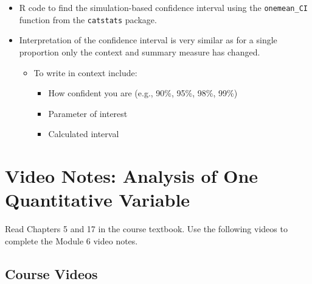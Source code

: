 \documentclass[
]{report}
\newenvironment{Shaded}{\begin{snugshade}}{\end{snugshade}}
\newcommand{\AttributeTok}[1]{\textcolor[rgb]{0.13,0.29,0.53}{#1}}
\newcommand{\CommentTok}[1]{\textcolor[rgb]{0.56,0.35,0.01}{\textit{#1}}}
\newcommand{\DecValTok}[1]{\textcolor[rgb]{0.00,0.00,0.81}{#1}}
\newcommand{\FunctionTok}[1]{\textcolor[rgb]{0.13,0.29,0.53}{\textbf{#1}}}
\newcommand{\NormalTok}[1]{#1}
\newcommand{\SpecialCharTok}[1]{\textcolor[rgb]{0.81,0.36,0.00}{\textbf{#1}}}
\newcommand{\StringTok}[1]{\textcolor[rgb]{0.31,0.60,0.02}{#1}}
\begin{document}
\begin{itemize}
\item
  R code to find the simulation-based confidence interval using the \texttt{onemean\_CI} function from the \texttt{catstats} package.

\begin{Shaded}
\end{Shaded}
\item
  Interpretation of the confidence interval is very similar as for a single proportion only the context and summary measure has changed.

  \begin{itemize}
  \item
    To write in context include:

    \begin{itemize}
    \item
      How confident you are (e.g., 90\%, 95\%, 98\%, 99\%)
    \item
      Parameter of interest
    \item
      Calculated interval
    \end{itemize}
  \end{itemize}
\end{itemize}

\newpage

\section{Video Notes: Analysis of One Quantitative Variable}\label{video-notes-analysis-of-one-quantitative-variable}

Read Chapters 5 and 17 in the course textbook. Use the following videos to complete the Module 6 video notes.

\subsection{Course Videos}\label{course-videos-4}
\end{document}
